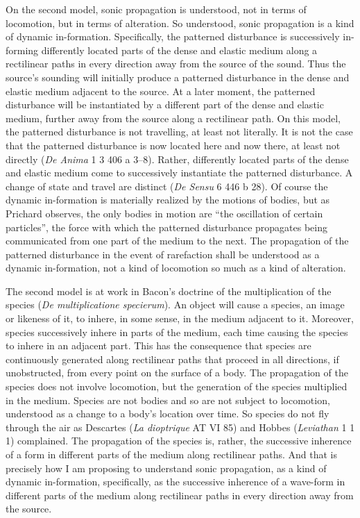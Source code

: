 \documentclass[12pt]{article}
\begin{document}
On the second model, sonic propagation is understood, not in terms of locomotion, but in terms of alteration. So understood, sonic propagation is a kind of dynamic in-formation. Specifically, the patterned disturbance is successively in-forming differently located parts of the dense and elastic medium along a rectilinear paths in every direction away from the source of the sound. Thus the source's sounding will initially produce a patterned disturbance in the dense and elastic medium adjacent to the source. At a later moment, the patterned disturbance will be instantiated by a different part of the dense and elastic medium, further away from the source along a rectilinear path. On this model, the patterned disturbance is not travelling, at least not literally. It is not the case that the patterned disturbance is now located here and now there, at least not directly (\emph{De Anima} 1 3 406 a 3--8). Rather, differently located parts of the dense and elastic medium come to successively instantiate the patterned disturbance. A change of state and travel are distinct (\emph{De Sensu} 6 446 b 28). Of course the dynamic in-formation is materially realized by the motions of bodies, but as Prichard observes, the only bodies in motion are ``the oscillation of certain particles'', the force with which the patterned disturbance propagates being communicated from one part of the medium to the next. The propagation of the patterned disturbance in the event of rarefaction shall be understood as a dynamic in-formation, not a kind of locomotion so much as a kind of alteration.

The second model is at work in Bacon's doctrine of the multiplication of the species (\emph{De multiplicatione specierum}). An object will cause a species, an image or likeness of it, to inhere, in some sense, in the medium adjacent to it. Moreover, species successively inhere in parts of the medium, each time causing the species to inhere in an adjacent part. This has the consequence that species are continuously generated along rectilinear paths that proceed in all directions, if unobstructed, from every point on the surface of a body. The propagation of the species does not involve locomotion, but the generation of the species multiplied in the medium. Species are not bodies and so are not subject to locomotion, understood as a change to a body’s location over time. So species do not fly through the air as Descartes (\emph{La dioptrique} AT VI 85) and Hobbes (\emph{Leviathan} 1 1 1) complained. The propagation of the species is, rather, the successive inherence of a form in different parts of the medium along rectilinear paths. And that is precisely how I am proposing to understand sonic propagation, as a kind of dynamic in-formation, specifically, as the successive inherence of a wave-form in different parts of the medium along rectilinear paths in every direction away from the source.
\end{document}
